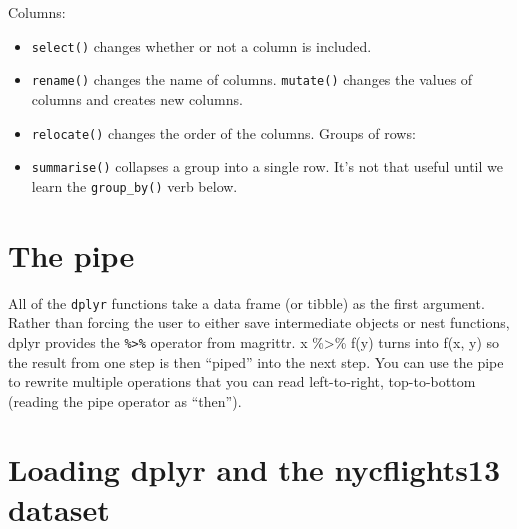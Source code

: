 \documentclass[
]{book}
\providecommand{\tightlist}{%
  \setlength{\itemsep}{0pt}\setlength{\parskip}{0pt}}
\begin{document}
Columns:

\begin{itemize}
\tightlist
\item
  \texttt{select()} changes whether or not a column is included.
\item
  \texttt{rename()} changes the name of columns.
  \texttt{mutate()} changes the values of columns and creates new columns.
\item
  \texttt{relocate()} changes the order of the columns.
  Groups of rows:
\item
  \texttt{summarise()} collapses a group into a single row. It's not that useful until we learn the \texttt{group\_by()} verb below.
\end{itemize}

\hypertarget{the-pipe}{%
\section{The pipe}\label{the-pipe}}

All of the \texttt{dplyr} functions take a data frame (or tibble) as the first argument. Rather than forcing the user to either save intermediate objects or nest functions, dplyr provides the \texttt{\%\textgreater{}\%} operator from magrittr. x \%\textgreater\% f(y) turns into f(x, y) so the result from one step is then ``piped'' into the next step. You can use the pipe to rewrite multiple operations that you can read left-to-right, top-to-bottom (reading the pipe operator as ``then'').

\hypertarget{loading-dplyr-and-the-nycflights13-dataset}{%
\section{Loading dplyr and the nycflights13 dataset}\label{loading-dplyr-and-the-nycflights13-dataset}}
\end{document}
